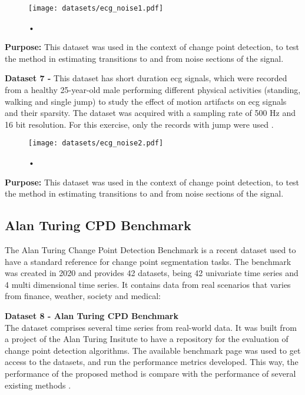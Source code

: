 \begin{figure}
\centering
\texttt{[image: datasets/ecg\_noise1.pdf]}
\caption{•}
\label{fig:ecg1_dataset}
\end{figure}

\textbf{Purpose:} This dataset was used in the context of change point detection, to test the method in estimating transitions to and from noise sections of the signal.
    
\textbf{Dataset 7 - } This dataset has short duration \gls{ecg} signals, which were recorded from a healthy 25-year-old male performing different physical activities (standing, walking and single jump) to study the effect of motion artifacts on \gls{ecg} signals and their sparsity. The dataset was acquired with a sampling rate of 500 Hz and 16 bit resolution. For this exercise, only the records with jump were used \cite{dataset7, PhysioNet}.\\

\begin{figure}
\centering
\texttt{[image: datasets/ecg\_noise2.pdf]}
\caption{•}
\label{fig:ecg2_dataset}
\end{figure}

\textbf{Purpose:} This dataset was used in the context of change point detection, to test the method in estimating transitions to and from noise sections of the signal.


\subsection{Alan Turing CPD Benchmark}
\label{sec:dataset8}

The Alan Turing Change Point Detection Benchmark is a recent dataset used to have a standard reference for change point segmentation tasks. The benchmark was created in 2020 and provides 42 datasets, being 42 univariate time series and 4 multi dimensional time series. It contains data from real scenarios that varies from finance, weather, society and medical:

\textbf{Dataset 8 - Alan Turing CPD Benchmark}\\
The dataset comprises several time series from real-world data. It was built from a project of the Alan Turing Insitute to have a repository for the evaluation of change point detection algorithms. The available benchmark page was used to get access to the datasets, and run the performance metrics developed. This way, the performance of the proposed method is compare with the performance of several existing methods \cite{cpd_alan}.\\

